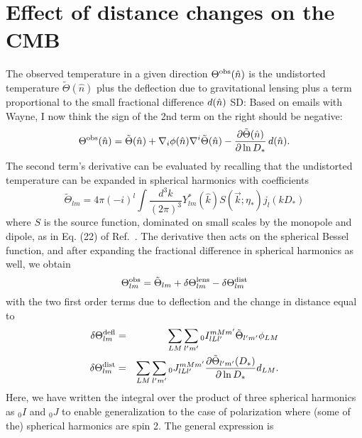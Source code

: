 \documentclass[prl,amsmath,amssymb,floatfix,superscriptaddress,nofootinbib,twocolumn]{revtex4-1}
\def\be{\begin{equation}}
\def\ee{\end{equation}}
\def\bea{\begin{eqnarray}}
\def\eea{\end{eqnarray}}
\newcommand{\eql}[1]{\label{eq:#1}}
\newcommand{\scott}[1]{{\color{darkgreen} SD: #1}}
\newcommand{\wh}[1]{{\color{red} WH: #1}}
\begin{document}
\section{Effect of distance changes on the CMB}
\newcommand\dtl{\delta\Theta^{\rm defl}}
\newcommand\dtd{\delta\Theta^{\rm dist}}
\newcommand\tob{\Theta^{\rm obs}}
\newcommand\tu{\tilde{\Theta}}
\newcommand\td{\Theta^{\rm dist}}
The %
observed temperature in a given direction $\tob(\hat n)$ is the undistorted temperature $\tu(\hat n)$ plus the deflection due to gravitational lensing plus a term proportional to the small fractional difference $d(\hat n)$ \scott{Based on emails with Wayne, I now think the sign of the 2nd term on the right should be negative}:
\be
\tob(\hat n) = \tu(\hat n) + \nabla_{i} \phi(\hat n) \nabla^{i}\tu(\hat n) - \frac{\partial\tu(\hat n)}{\partial \ln D_*}\, \fd(\hat n)
.\ee
%
%
%
%
The second term's derivative can be evaluated by recalling that the undistorted temperature can be expanded in spherical harmonics with coefficients
\be
\tu_{lm} = 4\pi(-i)^{l} \int \frac{d^{3}k}{(2\pi)^{3}}Y_{lm}^{*}(\hat{k})S(\vec k;\eta_{*})j_{l}(kD_{*}) 
\ee
where $S$ is the source function, dominated on small scales by the monopole and dipole, as in Eq. (22) of Ref.~\cite{Hu:2001bc}. The derivative then acts on the spherical Bessel function, and after expanding the fractional difference in spherical harmonics as well, we obtain
\be
\tob_{lm} = \tu_{lm} +\delta \Theta_{lm}^{\rm lens}- \delta \td_{lm}
\ee
with the two first order terms due to deflection and the change in distance equal to
\bea
\dtl_{lm} &=& \sum_{LM}\sum_{l'm'}{}_{0}I_{lLl'}^{mMm'}\tu_{l'm'}\phi_{LM}\\
\dtd_{lm} &=& \sum_{LM}\sum_{l'm'} {}_{0} J_{lLl'}^{mMm'}\frac{\partial \tu_{l'm'}(D_{*})}{\partial \ln D_{*}}d_{LM}\eql{dtd}
.\eea
Here, we have written the integral over the product of three spherical harmonics as $_0I$ and $_0J$ to enable generalization to the case of polarization where (some of the) spherical harmonics are spin 2. The general expression is  
\end{document}
